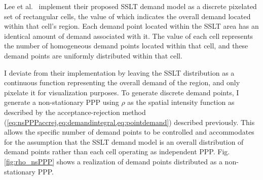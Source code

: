 \documentclass[12pt,dvipsnames]{report}
\begin{document}
Lee et al.~\cite{6554749} implement their proposed SSLT demand model as a discrete pixelated set of rectangular cells, the value of which indicates the overall demand located within that cell's region.  Each demand point located within the SSLT area has an identical amount of demand associated with it.  The value of each cell represents the number of homogeneous demand points located within that cell, and these demand points are uniformly distributed within that cell.

I deviate from their implementation by leaving the SSLT distribution as a continuous function representing the overall demand of the region, and only pixelate it for visualization purposes.  To generate discrete demand points, I generate a non-stationary PPP using $\rho$ as the spatial intensity function as described by the acceptance-rejection method (\cref{eq:nsPPPaccrej,eq:demandintegral,eq:pointdemand}) described previously.  This allows the specific number of demand points to be controlled and accommodates for the assumption that the SSLT demand model is an overall distribution of demand points rather than each cell operating as independent PPP.  Fig. \ref{fig:rho_nsPPP} shows a realization of demand points distributed as a non-stationary PPP.
\end{document}
